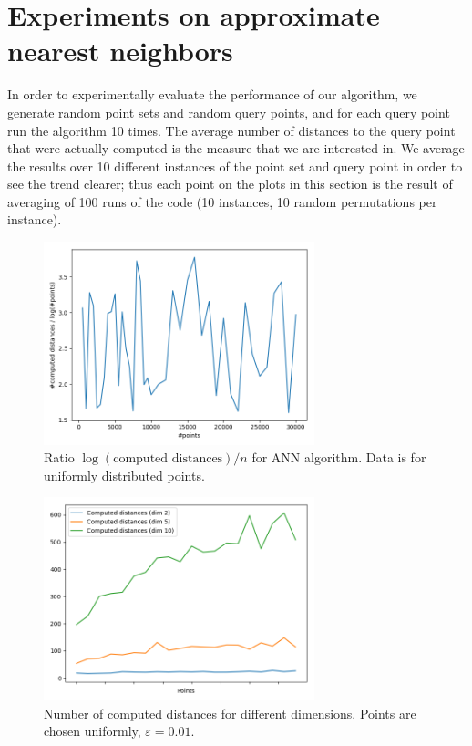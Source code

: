 \documentclass[a4paper,UKenglish,cleveref, autoref]{lipics-v2019}
\newcommand{\eps}{\varepsilon}
\begin{document}
\section{Experiments on approximate nearest neighbors}

In order to experimentally evaluate the performance of our algorithm,
we generate random point sets and random query points, and for each query point
run the algorithm 10 times. The average number of distances to the query point
that were actually computed is the measure that we are interested in.
We average the results over 10 different instances of the point
set and query point in order to see the trend clearer; thus
each point on the plots in this section is the result of averaging of 100 runs
of the code (10 instances, 10 random permutations per instance).

\begin{figure}[ht]
    \includegraphics[width=0.7\textwidth]{pics/log_dependency_constant_ratio.png}
    \caption{Ratio $\log(\mbox{computed distances}) / n$ for ANN algorithm. Data is for uniformly distributed
    points.}
    \label{fig:ann_const_ratio}
\end{figure}

\begin{figure}[ht]
    \includegraphics[width=0.7\textwidth]{pics/ann_computed_distances_dimension_dep.png}
    \caption{Number of computed distances for different dimensions. Points are chosen uniformly, $\eps = 0.01$.}
    \label{fig:ann_dimension_dependence}
\end{figure}
\end{document}
